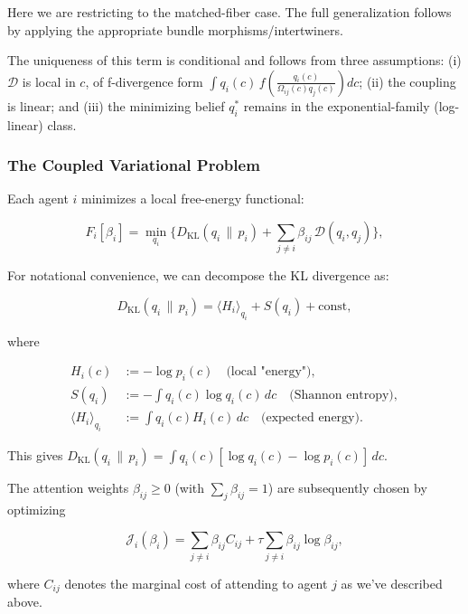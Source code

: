 \documentclass[twoside,11pt]{article}
\begin{document}
Here we are restricting to the matched-fiber case.  The full generalization follows by applying the appropriate bundle morphisms/intertwiners.

The uniqueness of this term is conditional and follows from three assumptions: (i) $\mathcal{D}$ is local in $c$, of f-divergence form $\displaystyle \int q_i(c)\, f\!\left(\frac{q_i(c)}{\Omega_{ij}(c) q_j(c)}\right) dc$; (ii) the coupling is linear; and (iii) the minimizing belief $q_i^*$ remains in the exponential-family (log-linear) class.

\subsubsection{The Coupled Variational Problem}
Each agent $i$ minimizes a local free-energy functional:

\begin{equation}
F_i[\beta_i]
=\min_{q_i}
\Big\{
D_{\mathrm{KL}}(q_i \,\|\, p_i)
+ \sum_{j\neq i} \beta_{ij}\,\mathcal{D}(q_i,q_j)
\Big\},
\label{eq:F_i}
\end{equation}

For notational convenience, we can decompose the KL divergence as:

\begin{equation}
D_{\mathrm{KL}}(q_i \,\|\, p_i) = \langle H_i \rangle_{q_i} + S(q_i) + \text{const},
\end{equation}

where

\begin{align}
H_i(c) &:= -\log p_i(c) \quad \text{(local "energy")}, \\
S(q_i) &:= -\int q_i(c) \log q_i(c)\,dc \quad \text{(Shannon entropy)}, \\
\langle H_i \rangle_{q_i} &:= \int q_i(c) H_i(c)\,dc \quad \text{(expected energy)}.
\end{align}

This gives $D_{\mathrm{KL}}(q_i \,\|\, p_i) = \int q_i(c)[\log q_i(c) - \log p_i(c)]\,dc$.

The attention weights $\beta_{ij}\ge 0$ (with $\sum_j \beta_{ij}=1$) are subsequently chosen by optimizing

\begin{equation}
\mathcal{J}_i(\beta_i)
=\sum_{j\neq i}\beta_{ij} C_{ij}
+ \tau \sum_{j\neq i}\beta_{ij}\log\beta_{ij},
\label{eq:J_i}
\end{equation}

where $C_{ij}$ denotes the marginal cost of attending to agent $j$ as we've described above.
\end{document}
